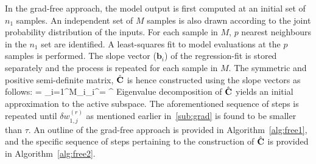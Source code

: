 In the grad-free approach, the model output is first computed at an initial set of $n_1$ samples. An independent
set of $M$ samples is also drawn according to the joint probability distribution of the inputs. For each sample
in $M$, $p$ nearest neighbours in the $n_1$ set are identified. A least-squares fit to model evaluations at
the $p$ samples is performed. The slope vector ($\bm{b}_i$) of the regression-fit is stored separately and the process is
repeated for each sample in $M$. The symmetric and positive semi-definite matrix, $\hat{\mathbf{{C}}}$ is hence constructed
using the slope vectors as follows:
%
\be
{} = \sum\limits_{i=1}^{M}_i_i^\top = \hat{\bm{\Lambda}}^\top
\ee
%
Eigenvalue decomposition of $\hat{\mathbf{{C}}}$ yields an initial approximation to the
active subspace. The aforementioned sequence of steps is repeated until $\delta w_{1,j}^{(r)}$ as mentioned
earlier in~\ref{sub:grad} is found to be smaller than $\tau$. An outline of the grad-free approach is
provided in Algorithm~\ref{alg:free1}, and the specific sequence of steps pertaining to the construction of
$\hat{\mathbf{{C}}}$ is provided in Algorithm~\ref{alg:free2}.
 



